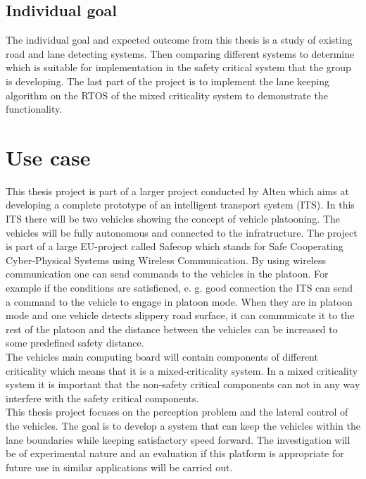 \subsection{Individual goal}
The individual goal and expected outcome from this thesis is a study of existing road and lane detecting systems. Then comparing different systems to determine which is suitable for implementation in the safety critical system that the group is developing. The last part of the project is to implement the lane keeping algorithm on the RTOS of the mixed criticality system to demonstrate the functionality.

\section{Use case}
This thesis project is part of a larger project conducted by Alten which aims at developing a complete prototype of an intelligent transport system (ITS). In this ITS there will be two vehicles showing the concept of vehicle platooning. The vehicles will be fully autonomous and connected to the infratructure. The project is part of a large EU-project called Safecop which stands for Safe Cooperating Cyber-Physical Systems using Wireless Communication. By using wireless communication one can send commands to the vehicles in the platoon. For example if the conditions are satisfiened, e. g. good connection the ITS can send a command to the vehicle to engage in platoon mode. When they are in platoon mode and one vehicle detects slippery road surface, it can communicate it to the rest of the platoon and the distance between the vehicles can be increased to some predefined safety distance.\\

The vehicles main computing board will contain components of different criticality which means that it is a mixed-criticality system. In a mixed criticality system it is important that the non-safety critical components can not in any way interfere with the safety critical components.\\


This thesis project focuses on the perception problem and the lateral control of the vehicles. The goal is to develop a system that can keep the vehicles within the lane boundaries while keeping satisfactory speed forward. The investigation will be of experimental nature and an evaluation if this platform is appropriate for future use in similar applications will be carried out.





